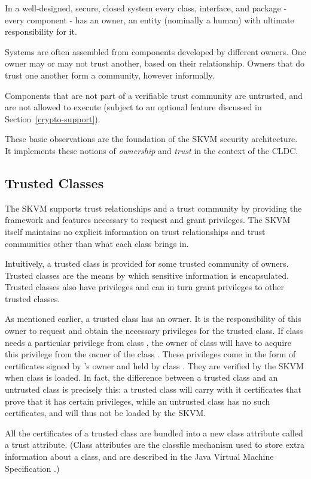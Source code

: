 \documentclass{llncs}
\begin{document}
In a well-designed, secure, closed system every class, interface,
and package - every component - has an owner, an entity (nominally
a human) with ultimate responsibility for it.

Systems are often assembled from components developed by different
owners. One owner may or may not trust another, based on their
relationship. Owners that do trust one another form a community,
however informally.

Components that are not part of a verifiable trust community are
untrusted, and are not allowed to execute (subject to an optional
feature discussed in Section~\ref{crypto-support}).

These basic observations are the foundation of the SKVM security
architecture. It implements these notions of \emph{ownership} and
\emph{trust} in the context of the CLDC.

\subsection{Trusted Classes}

The SKVM supports trust relationships and a trust community by
providing the framework and features necessary to request and grant
privileges. The SKVM itself maintains no explicit information on
trust relationships and trust communities other than what each class
brings in.

Intuitively, a trusted class is provided for some trusted community
of owners. Trusted classes are the means by which sensitive information
is encapsulated. Trusted classes also have privileges and can in
turn grant privileges to other trusted classes.

As mentioned earlier, a trusted class has an owner. It is the
responsibility of this owner to request and obtain the necessary
privileges for the trusted class. If class  needs a particular
privilege from class , the owner of class  will have to acquire
this privilege from the owner of the class . These privileges come
in the form of certificates signed by 's owner and held by class
. They are verified by the SKVM when class  is loaded. In fact,
the difference between a trusted class and an untrusted class is
precisely this: a trusted class will carry with it certificates
that prove that it has certain privileges, while an untrusted class
has no such certificates, and will thus not be loaded by the SKVM.

All the certificates of a trusted class are bundled into a new class
attribute called a trust attribute. (Class attributes are the
classfile mechanism used to store extra information about a class,
and are described in the Java Virtual Machine Specification \cite[section 4.7]{jvms}.)
\end{document}
